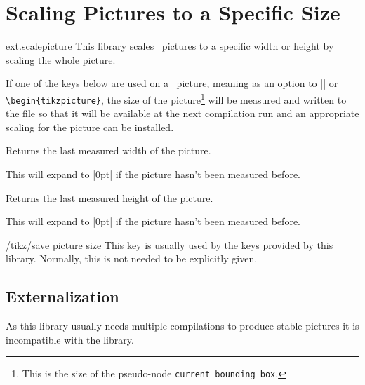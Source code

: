 %
%
%
\clearpage
\section{Scaling Pictures to a Specific Size}
\label{library:scalepicture}

\begin{tikzlibrary}{ext.scalepicture}
  This library scales \tikzname\ pictures to a specific width or height
  by scaling the whole picture.
\end{tikzlibrary}

\begin{multicols}{2}
If one of the keys below are used on a \tikzname\ picture, meaning
as an option to |\tikzpicture| or \texttt{\textbackslash begin\{tikzpicture\}},
the size of the picture\footnote{This is the size of the pseudo-node \texttt{current bounding box}.}
will be measured and written to the  file
so that it will be available at the next compilation run
and an appropriate scaling for the picture can be installed.

\begin{command}{\tikzextpicturewidth}
  Returns the last measured width of the picture.
  
  This will expand to |0pt| if the picture hasn't been measured before.
\end{command}
\begin{command}{\tikzextpictureheight}
  Returns the last measured height of the picture.
  
  This will expand to |0pt| if the picture hasn't been measured before.
\end{command}

\begin{stylekey}{/tikz/save picture size}
  This key is usually used by the keys provided by this library.
  Normally, this is not needed to be explicitly given.
\end{stylekey}

\subsection{Externalization}
As this library usually needs multiple compilations
to produce stable pictures it is incompatible
with the  library.


\end{multicols}
